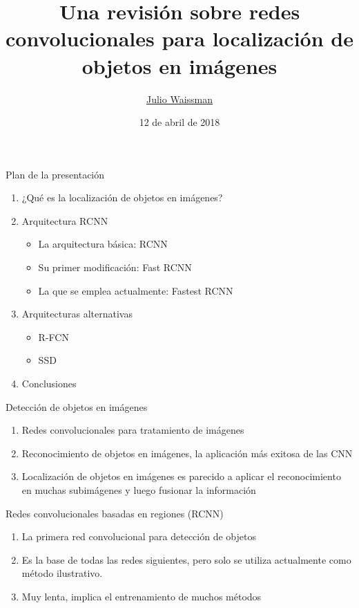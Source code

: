 \documentclass[presentation, t]{beamer}
\author{\href{mailto:julio.waissman@unison.mx}{Julio Waissman}}
\date{12 de abril de 2018}
\title{Una revisión sobre redes convolucionales para localización de objetos en imágenes}
\institute[Unison]{Licenciatura en Ciencias de la Computación\\Universidad de Sonora}
\begin{document}
\maketitle


\begin{frame}[label={sec:orgbc0108b}]{Plan de la presentación}
\begin{enumerate}
\item ¿Qué es la localización de objetos en imágenes?
\item Arquitectura RCNN
\begin{itemize}
\item La arquitectura básica: RCNN
\item Su primer modificación: Fast RCNN
\item La que se emplea actualmente: Fastest RCNN\vfill
\end{itemize}
\item Arquitecturas alternativas
\begin{itemize}
\item R-FCN
\item SSD\vfill
\end{itemize}
\item Conclusiones\vfill
\end{enumerate}
\end{frame}



\begin{frame}[label={sec:org124ae9e}]{Detección de objetos en imágenes}
\begin{enumerate}
\item Redes convolucionales para tratamiento de imágenes\vfill

\item Reconocimiento de objetos en imágenes, la aplicación más exitosa de
las CNN\vfill

\item Localización de objetos en imágenes es parecido a aplicar el
reconocimiento en muchas subimágenes y luego fusionar la
información\vfill
\end{enumerate}
\end{frame}





\begin{frame}[label={sec:org6b47e45}]{Redes convolucionales basadas en regiones (RCNN)}
\begin{enumerate}
\item La primera red convolucional para detección de objetos

\item Es la base de todas las redes siguientes, pero solo se utiliza
actualmente como método ilustrativo.

\item Muy lenta, implica el entrenamiento de muchos métodos
\end{enumerate}
\end{frame}
\end{document}
